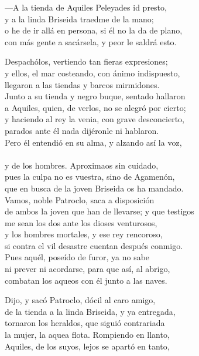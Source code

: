 ---A la tienda de Aquiles Peleyades id presto,\\
y a la linda Briseida traedme de la mano;\\
o he de ir allá en persona, si él no la da de plano,\\
con más gente a sacársela, y peor le saldrá esto.\par
Despachólos, vertiendo tan fieras expresiones;\\
y ellos, el mar costeando, con ánimo indispuesto,\\
llegaron a las tiendas y barcos mirmidones.\\
Junto a su tienda y negro buque, sentado hallaron\\
a Aquiles, quien, de verlos, no se alegró por cierto;\\
y haciendo al rey la venia, con grave desconcierto,\\
parados ante él nada dijéronle ni hablaron.\\
Pero él entendió en su alma, y alzando así la voz,\\
\\
y de los hombres. Aproximaos sin cuidado,\\
pues la culpa no es vuestra, sino de Agamenón,\\
que en busca de la joven Briseida os ha mandado.\\
Vamos, noble Patroclo, saca a disposición\\
de ambos la joven que han de llevarse; y que testigos\\
me sean los dos ante los dioses venturosos,\\
y los hombres mortales, y ese rey rencoroso,\\
si contra el vil desastre cuentan después conmigo.\\
Pues aquél, poseído de furor, ya no sabe\\
ni prever ni acordarse, para que así, al abrigo,\\
combatan los aqueos con él junto a las naves.\par
Dijo, y sacó Patroclo, dócil al caro amigo,\\
de la tienda a la linda Briseida, y ya entregada,\\
tornaron los heraldos, que siguió contrariada\\
la mujer, la aquea flota. Rompiendo en llanto,\\
Aquiles, de los suyos, lejos se apartó en tanto,\\
